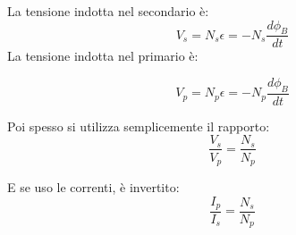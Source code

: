La tensione indotta nel secondario è:
\begin{equation}
    V_s = N_s\epsilon = -N_s\frac{d\phi_B}{dt}
\end{equation}
La tensione indotta nel primario è:

\begin{equation}
    V_p = N_p\epsilon = -N_p\frac{d\phi_B}{dt}
\end{equation}

Poi spesso si utilizza semplicemente il rapporto:
\begin{equation}
    \frac{V_s}{V_p}=\frac{N_s}{N_p}
\end{equation}

E se uso le correnti, è invertito:
\begin{equation}
    \frac{I_p}{I_s}=\frac{N_s}{N_p}
\end{equation}